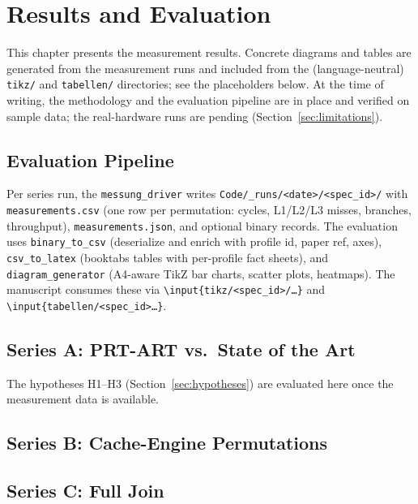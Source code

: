\chapter{Results and Evaluation}\label{ch:results}

This chapter presents the measurement results. Concrete diagrams and tables are generated
from the measurement runs and included from the (language-neutral) \texttt{tikz/} and
\texttt{tabellen/} directories; see the placeholders below. At the time of writing, the
methodology and the evaluation pipeline are in place and verified on sample data; the
real-hardware runs are pending (Section~\ref{sec:limitations}).

\section{Evaluation Pipeline}\label{sec:eval-pipeline}

Per series run, the \texttt{messung\_driver} writes
\texttt{Code/\_runs/<date>/<spec\_id>/} with \texttt{measurements.csv} (one row per
permutation: cycles, L1/L2/L3 misses, branches, throughput), \texttt{measurements.json},
and optional binary records. The evaluation uses \texttt{binary\_to\_csv} (deserialize and
enrich with profile id, paper ref, axes), \texttt{csv\_to\_latex} (booktabs tables with
per-profile fact sheets), and \texttt{diagram\_generator} (A4-aware TikZ bar charts,
scatter plots, heatmaps). The manuscript consumes these via
\texttt{\textbackslash input\{tikz/<spec\_id>/\ldots\}} and
\texttt{\textbackslash input\{tabellen/<spec\_id>\ldots\}}.

\section{Series A: PRT-ART vs.\ State of the Art}\label{sec:result-a}

%   
%   
The hypotheses H1--H3 (Section~\ref{sec:hypotheses}) are evaluated here once the
measurement data is available.

\section{Series B: Cache-Engine Permutations}\label{sec:result-b}

% 

\section{Series C: Full Join}\label{sec:result-c}

